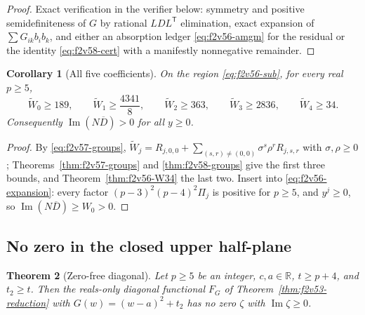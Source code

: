 \documentclass[11pt]{article}
\newtheorem{theorem}{Theorem}[section]
\newtheorem{corollary}[theorem]{Corollary}
\theoremstyle{definition}
\theoremstyle{remark}
\begin{document}
\begin{proof}
Exact verification in the verifier below: symmetry and positive
semidefiniteness of \(G\) by rational \(LDL^{\mathsf T}\) elimination,
exact expansion of \(\sum G_{ik}b_ib_k\), and either an absorption
ledger \eqref{eq:f2v56-amgm} for the residual or the identity
\eqref{eq:f2v58-cert} with a manifestly nonnegative remainder.
\end{proof}

\begin{corollary}[All five coefficients]
\label{cor:f2v58-all}
On the region \eqref{eq:f2v56-sub}, for every real \(p\ge5\),
\begin{equation}
 \widetilde W_0\ge189,\qquad \widetilde W_1\ge\frac{4341}8,\qquad
 \widetilde W_2\ge363,\qquad \widetilde W_3\ge2836,\qquad
 \widetilde W_4\ge34 .
 \label{eq:f2v58-W}
\end{equation}
Consequently \(\operatorname{Im}(N\overline D)>0\) for all \(y\ge0\).
\end{corollary}

\begin{proof}
By \eqref{eq:f2v57-groups},
\(\widetilde W_j=R_{j,0,0}+\sum_{(s,r)\ne(0,0)}\sigma^s\rho^rR_{j,s,r}\)
with \(\sigma,\rho\ge0\); Theorems~\ref{thm:f2v57-groups} and
\ref{thm:f2v58-groups} give the first three bounds, and
Theorem~\ref{thm:f2v56-W34} the last two.  Insert into
\eqref{eq:f2v56-expansion}: every factor
\((p-3)^2(p-4)^2\Pi_j\) is positive for \(p\ge5\), and
\(y^j\ge0\), so \(\operatorname{Im}(N\overline D)\ge W_0>0\).
\end{proof}

\subsection{No zero in the closed upper half-plane}

\begin{theorem}[Zero-free diagonal]
\label{thm:f2v58-zero-free}
Let \(p\ge5\) be an integer, \(c,a\in\mathbb R\), \(t\ge p+4\), and
\(t_2\ge t\).  Then the reals-only diagonal functional \(F_G\) of
Theorem~\ref{thm:f2v53-reduction} with \(G(w)=(w-a)^2+t_2\) has no zero
\(\zeta\) with \(\operatorname{Im}\zeta\ge0\).
\end{theorem}
\end{document}
